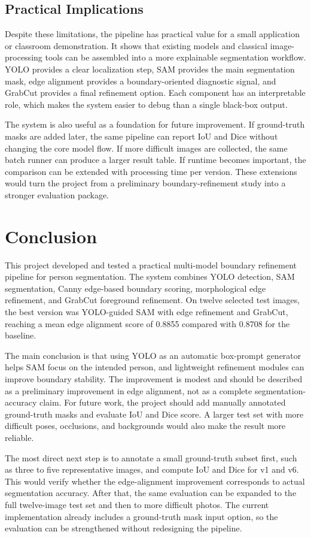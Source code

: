 \documentclass[conference]{IEEEtran}
\begin{document}
\subsection{Practical Implications}
Despite these limitations, the pipeline has practical value for a small application or classroom demonstration. It shows that existing models and classical image-processing tools can be assembled into a more explainable segmentation workflow. YOLO provides a clear localization step, SAM provides the main segmentation mask, edge alignment provides a boundary-oriented diagnostic signal, and GrabCut provides a final refinement option. Each component has an interpretable role, which makes the system easier to debug than a single black-box output.

The system is also useful as a foundation for future improvement. If ground-truth masks are added later, the same pipeline can report IoU and Dice without changing the core model flow. If more difficult images are collected, the same batch runner can produce a larger result table. If runtime becomes important, the comparison can be extended with processing time per version. These extensions would turn the project from a preliminary boundary-refinement study into a stronger evaluation package.

\section{Conclusion}
This project developed and tested a practical multi-model boundary refinement pipeline for person segmentation. The system combines YOLO detection, SAM segmentation, Canny edge-based boundary scoring, morphological edge refinement, and GrabCut foreground refinement. On twelve selected test images, the best version was YOLO-guided SAM with edge refinement and GrabCut, reaching a mean edge alignment score of 0.8855 compared with 0.8708 for the baseline.

The main conclusion is that using YOLO as an automatic box-prompt generator helps SAM focus on the intended person, and lightweight refinement modules can improve boundary stability. The improvement is modest and should be described as a preliminary improvement in edge alignment, not as a complete segmentation-accuracy claim. For future work, the project should add manually annotated ground-truth masks and evaluate IoU and Dice score. A larger test set with more difficult poses, occlusions, and backgrounds would also make the result more reliable.

The most direct next step is to annotate a small ground-truth subset first, such as three to five representative images, and compute IoU and Dice for v1 and v6. This would verify whether the edge-alignment improvement corresponds to actual segmentation accuracy. After that, the same evaluation can be expanded to the full twelve-image test set and then to more difficult photos. The current implementation already includes a ground-truth mask input option, so the evaluation can be strengthened without redesigning the pipeline.
\end{document}
